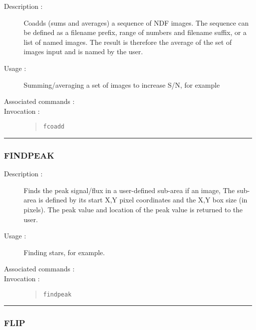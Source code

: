 \begin{description}

\item[Description :] Coadds (sums and averages) a sequence of NDF
images.  The sequence can be defined as a filename prefix, range of
numbers and filename suffix, or a list of named images.  The result is
therefore the average of the set of images input and is named by the
user.

\item[Usage :] Summing/averaging a set of images to increase S/N, for example

\item[Associated commands :] {\tt {}}

\item[Invocation :]

\begin{quote}{\tt  fcoadd }\end{quote}

\end{description}

\hrule 
\subsubsection*{\label{FINDPEAK}FINDPEAK}

\begin{description}

\item[Description :] Finds the peak signal/flux in a user-defined
sub-area if an image, The sub-area is defined by its start X,Y pixel
coordinates and the X,Y box size (in pixels).  The peak value and
location of the peak value is returned to the user.

\item[Usage :] Finding stars, for example.

\item[Associated commands :] {\tt {}}

\item[Invocation :]

\begin{quote}{\tt  findpeak }\end{quote}

\end{description}

\hrule 
\subsubsection*{\label{FLIP}FLIP}

